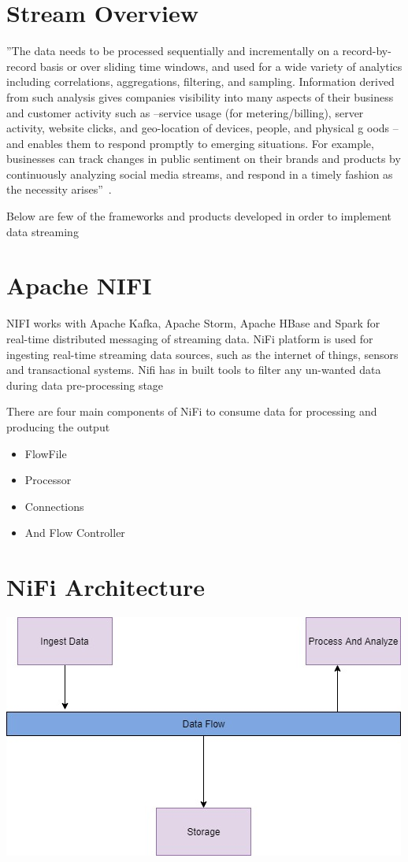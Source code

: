 \section{Stream Overview}
''The data needs to be processed sequentially and incrementally on a record-by-record basis or over sliding time windows, 
and used for a wide variety of analytics including correlations, aggregations, filtering, and sampling. 
Information derived from such analysis gives companies visibility into many aspects of their business and customer activity 
such as –service usage (for metering/billing), server activity, website clicks, and geo-location of devices, people, and physical g
oods –and enables them to respond promptly to emerging situations. For example, businesses can track changes in public sentiment 
on their brands and products by continuously analyzing social media streams, 
and respond in a timely fashion as the necessity arises''~\cite{hid-sp18-514-bigdata-stream-overview}.
 
Below are few of the frameworks and products developed in order to implement data streaming
 
\section{Apache NIFI}
 
NIFI works with Apache Kafka, Apache Storm, Apache HBase and Spark for real-time distributed messaging of streaming data. 
NiFi platform is used for ingesting real-time streaming data sources, such as the internet of things, 
sensors and transactional systems. Nifi has in built tools to filter any un-wanted data during data pre-processing stage

There are four main components of NiFi to consume data for processing and producing the output
 
\begin{itemize}
\item FlowFile
\item Processor
\item Connections
\item And Flow Controller
\end{itemize}
 
\section{NiFi Architecture}

\centering\includegraphics[width=\columnwidth]{images/NiFi.jpg}
 
